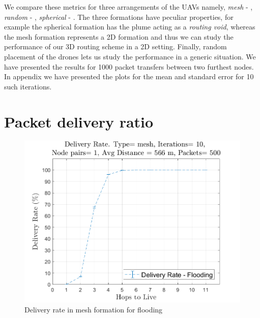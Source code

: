 We compare these metrics for three arrangements of the UAVs namely, \emph{mesh} - , \emph{random} - , \emph{spherical} - . The three formations have peculiar properties, for example the spherical formation has the plume acting as a \emph{routing void}, whereas the mesh formation represents a 2D formation and thus we can study the performance of our 3D routing scheme in a 2D setting. Finally, random placement of the drones lets us study the performance in a generic situation. We have presented the results for 1000 packet transfers between two furthest nodes. In appendix we have presented the plots for the mean and standard error for 10 such iterations.

\section{Packet delivery ratio}
\label{pdr}

\begin{figure}[hbtp]
\centering
\includegraphics[width=\simResultFigSize \textwidth]{ncsuthesis-0.6/Chapter-5/figs/fl_DR_mesh.png}
\caption{Delivery rate in mesh formation for flooding}
\label{fig:fl_DR_mesh}
\end{figure}

